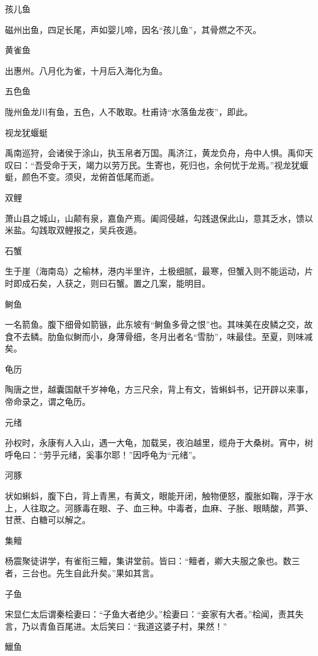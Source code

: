 \documentclass[a4paper,12pt,UTF8,twoside]{ctexbook}
\begin{document}
    孩儿鱼
    
    磁州出鱼，四足长尾，声如婴儿啼，因名“孩儿鱼”，其骨燃之不灭。
    
    黄雀鱼
    
    出惠州。八月化为雀，十月后入海化为鱼。
    
    五色鱼
    
    陇州鱼龙川有鱼，五色，人不敢取。杜甫诗“水落鱼龙夜”，即此。
    
    视龙犹蝘蜓
    
    禹南巡狩，会诸侯于涂山，执玉帛者万国。禹济江，黄龙负舟，舟中人惧。禹仰天叹曰：“吾受命于天，竭力以劳万民。生寄也，死归也，余何忧于龙焉。”视龙犹蝘蜓，颜色不变。须臾，龙俯首低尾而逝。
    
    双鲤
    
    萧山县之城山，山颠有泉，嘉鱼产焉。阖闾侵越，勾践退保此山，意其乏水，馈以米盐。勾践取双鲤报之，吴兵夜遁。
    
    石蟹
    
    生于崖（海南岛）之榆林，港内半里许，土极细腻，最寒，但蟹入则不能运动，片时即成石矣，人获之，则曰石蟹。置之几案，能明目。
    
    鲥鱼
    
    一名箭鱼。腹下细骨如箭镞，此东坡有“鲥鱼多骨之恨”也。其味美在皮鳞之交，故食不去鳞。肋鱼似鲥而小，身薄骨细，冬月出者名“雪肋”，味最佳。至夏，则味减矣。
    
    龟历
    
    陶唐之世，越囊国献千岁神龟，方三尺余，背上有文，皆蝌蚪书，记开辟以来事，帝命录之，谓之龟历。
    
    元绪
    
    孙权时，永康有人入山，遇一大龟，加载吴，夜泊越里，缆舟于大桑树。宵中，树呼龟曰：“劳乎元绪，奚事尔耶！”因呼龟为“元绪”。
    
    河豚
    
    状如蝌蚪，腹下白，背上青黑，有黄文，眼能开闭，触物便怒，腹胀如鞠，浮于水上，人往取之。河豚毒在眼、子、血三种。中毒者，血麻、子胀、眼睛酸，芦笋、甘蔗、白糖可以解之。
    
    集鳣
    
    杨震聚徒讲学，有雀衔三鳣，集讲堂前。皆曰：“鳣者，卿大夫服之象也。数三者，三台也。先生自此升矣。”果如其言。
    
    子鱼
    
    宋显仁太后谓秦桧妻曰：“子鱼大者绝少。”桧妻曰：“妾家有大者。”桧闻，责其失言，乃以青鱼百尾进。太后笑曰：“我道这婆子村，果然！”
    
    鱲鱼
    
\end{document}
